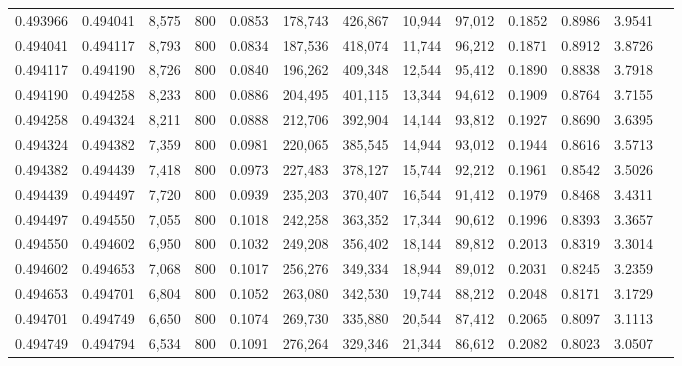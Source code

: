 \begin{tabular}{rrrrrrrrrrrrr}
0.493966 & 0.494041 &  8,575 & 800 &                                     0.0853 & 178,743 & 426,867 &  10,944 &  97,012 & 0.1852 & 0.8986 & 3.9541 \\
0.494041 & 0.494117 &  8,793 & 800 &                                     0.0834 & 187,536 & 418,074 &  11,744 &  96,212 & 0.1871 & 0.8912 & 3.8726 \\
0.494117 & 0.494190 &  8,726 & 800 &                                     0.0840 & 196,262 & 409,348 &  12,544 &  95,412 & 0.1890 & 0.8838 & 3.7918 \\
0.494190 & 0.494258 &  8,233 & 800 &                                     0.0886 & 204,495 & 401,115 &  13,344 &  94,612 & 0.1909 & 0.8764 & 3.7155 \\
0.494258 & 0.494324 &  8,211 & 800 &                                     0.0888 & 212,706 & 392,904 &  14,144 &  93,812 & 0.1927 & 0.8690 & 3.6395 \\
0.494324 & 0.494382 &  7,359 & 800 &                                     0.0981 & 220,065 & 385,545 &  14,944 &  93,012 & 0.1944 & 0.8616 & 3.5713 \\
0.494382 & 0.494439 &  7,418 & 800 &                                     0.0973 & 227,483 & 378,127 &  15,744 &  92,212 & 0.1961 & 0.8542 & 3.5026 \\
0.494439 & 0.494497 &  7,720 & 800 &                                     0.0939 & 235,203 & 370,407 &  16,544 &  91,412 & 0.1979 & 0.8468 & 3.4311 \\
0.494497 & 0.494550 &  7,055 & 800 &                                     0.1018 & 242,258 & 363,352 &  17,344 &  90,612 & 0.1996 & 0.8393 & 3.3657 \\
0.494550 & 0.494602 &  6,950 & 800 &                                     0.1032 & 249,208 & 356,402 &  18,144 &  89,812 & 0.2013 & 0.8319 & 3.3014 \\
0.494602 & 0.494653 &  7,068 & 800 &                                     0.1017 & 256,276 & 349,334 &  18,944 &  89,012 & 0.2031 & 0.8245 & 3.2359 \\
0.494653 & 0.494701 &  6,804 & 800 &                                     0.1052 & 263,080 & 342,530 &  19,744 &  88,212 & 0.2048 & 0.8171 & 3.1729 \\
0.494701 & 0.494749 &  6,650 & 800 &                                     0.1074 & 269,730 & 335,880 &  20,544 &  87,412 & 0.2065 & 0.8097 & 3.1113 \\
0.494749 & 0.494794 &  6,534 & 800 &                                     0.1091 & 276,264 & 329,346 &  21,344 &  86,612 & 0.2082 & 0.8023 & 3.0507 \\

\end{tabular}
